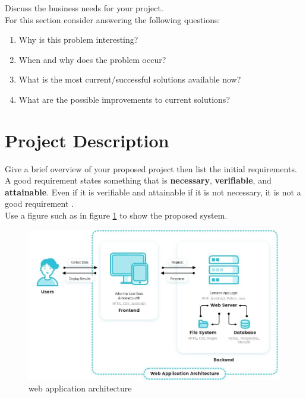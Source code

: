 \documentclass[hidelinks,a4paper,12pt]{article}
\begin{document}
Discuss the business needs for your project. \\
For this section consider answering the following questions:
\begin{enumerate}
\item Why is this problem interesting?
\item When and why does the problem occur?
\item What is the most current/successful solutions available now?
\item What are the possible improvements to current solutions?
\end{enumerate}

\section{Project Description}
Give a brief overview of your proposed project then list the initial requirements. A good requirement states something that is \textbf{necessary}, \textbf{verifiable}, and \textbf{attainable}. Even if it is verifiable and attainable if it is not necessary, it is not a good requirement \cite{hooks1994writing,ieee1998ieee,knauss2008}.
\\Use a figure such as in figure \ref{fig:overview} to show the proposed system.

\begin{figure}[h]
\centering
\includegraphics[width=0.8\linewidth]{images/web_app_Arch.jpeg}
\caption{web application architecture}
\label{fig:overview}
\end{figure}
\newpage
\end{document}
